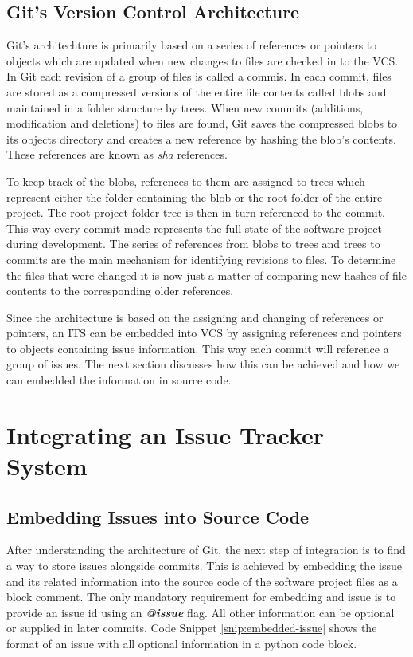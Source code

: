 \documentclass{mproj}
\begin{document}
\subsection{Git's Version Control Architecture}

Git's architechture is primarily based on a series of references or pointers to objects which are updated when new changes to files are checked in to the VCS. In Git each revision of a group of files is called a commis. In each commit, files are stored as a compressed versions of the entire file contents called blobs and maintained in a folder structure by trees. When new commits (additions, modification and deletions) to files are found, Git saves the compressed blobs to its objects directory and creates a new reference by hashing the blob's contents. These references are known as \textit{sha} references. 

To keep track of the blobs, references to them are assigned to trees which represent either the folder containing the blob or the root folder of the entire project.  The root project folder tree is then in turn referenced to the commit. This way every commit made represents the full state of the software project during development. The series of references from blobs to trees and trees to commits are the main mechanism for identifying revisions to files. To determine the files that were changed it is now just a matter of comparing new hashes of file contents to the corresponding older references.

Since the architecture is based on the assigning and changing of references or pointers, an ITS can be embedded into VCS by assigning references and pointers to objects containing issue information. This way each commit will reference a group of issues. The next section discusses how this can be achieved and how we can embedded the information in source code.





\section{Integrating an Issue Tracker System}


\subsection{Embedding Issues into Source Code}

After understanding the architecture of Git, the next step of integration is to find a way to store issues alongside commits. This is achieved by embedding the issue and its related information into the source code of the software project files as a block comment. The only mandatory requirement for embedding and issue is to provide an issue id using an \textbf{\textit{@issue}} flag. All other information can be optional or supplied in later commits. Code Snippet \ref{snip:embedded-issue} shows the format of an issue with all optional information in a python code block.
\end{document}
